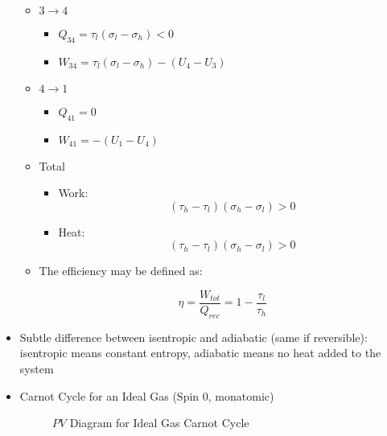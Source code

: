\begin{itemize}
\begin{itemize}
      \item $3\to4$

        \begin{itemize}

          \item $Q_{34}=\tau_l(\sigma_l-\sigma_h)<0$

          \item $W_{34}=\tau_l(\sigma_l-\sigma_h)-(U_4-U_3)$

        \end{itemize}

      \item $4\to1$

        \begin{itemize}

          \item $Q_{41}=0$

          \item $W_{41}=-(U_1-U_4)$

        \end{itemize}

      \item Total

        \begin{itemize}

          \item Work: $$(\tau_h-\tau_l)(\sigma_h-\sigma_l)>0$$

          \item Heat: $$(\tau_h-\tau_l)(\sigma_h-\sigma_l)>0$$

        \end{itemize}

      \item The efficiency may be defined as:

        $$\eta=\frac{W_{tot}}{Q_{rec}}=1-\frac{\tau_l}{\tau_h}$$

    \end{itemize}

  \item Subtle difference between isentropic and adiabatic (same if reversible): isentropic means constant entropy, adiabatic means no heat added to the system

  \item Carnot Cycle for an Ideal Gas (Spin 0, monatomic)

    \begin{figure}[H]
      \centering
      
      \caption{$PV$ Diagram for Ideal Gas Carnot Cycle}
      \label{fig:2}
    \end{figure}


\end{itemize}
